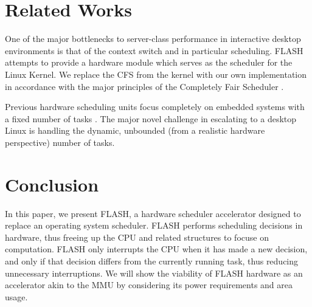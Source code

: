 \documentclass{sig-alternate-10pt}
\begin{document}
\section{Related Works}
One of the major bottlenecks to server-class performance in interactive
desktop environments is that of the context switch and in particular
scheduling.  FLASH attempts to provide a hardware module which serves as the
scheduler for the Linux Kernel.  We replace the CFS from the kernel with our
own implementation in accordance with the major principles of the Completely
Fair Scheduler \cite{wong2008cfs}.

Previous hardware scheduling units focus completely on embedded systems with
a fixed number of tasks \cite{nakano1995hardware, morton2004hardware,
nacul2007hardware, kuacharoen2003configurable, park2008hardware}.  The major
novel challenge in escalating to a desktop Linux is handling the dynamic,
unbounded (from a realistic hardware perspective) number of tasks.


\section{Conclusion}
In this paper, we present FLASH, a hardware scheduler accelerator designed to replace an operating system scheduler. FLASH performs scheduling decisions in hardware, thus freeing up the CPU and related structures to focuse on computation. FLASH only interrupts the CPU when it has made a new decision, and only if that decision differs from the currently running task, thus reducing unnecessary interruptions. We will show the viability of FLASH hardware as an accelerator akin to the MMU by considering its power requirements and area usage.

\nocite{*}
{
	
	
}
\end{document}
